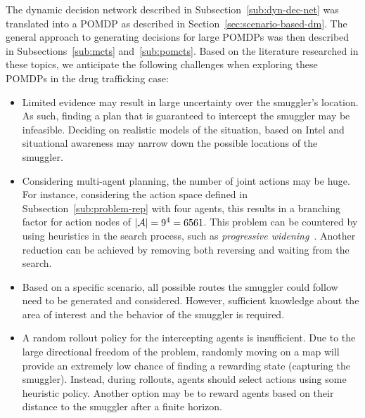 \documentclass[conference]{IEEEtran}
\begin{document}

The dynamic decision network described in Subsection~\ref{sub:dyn-dec-net} was translated into a POMDP as described in Section~\ref{sec:scenario-based-dm}. The general approach to generating decisions for large POMDPs was then described in Subsections~\ref{sub:mcts} and~\ref{sub:pomcts}. Based on the literature researched in these topics, we anticipate the following challenges when exploring these POMDPs in the drug trafficking case:
\begin{itemize}
\item Limited evidence may result in large uncertainty over the smuggler's location. As such, finding a plan that is guaranteed to intercept the smuggler may be infeasible. Deciding on realistic models of the situation, based on Intel and situational awareness may narrow down the possible locations of the smuggler.
\item Considering multi-agent planning, the number of joint actions may be huge. For instance, considering the action space defined in Subsection~\ref{sub:problem-rep} with four agents, this results in a branching factor for action nodes of $\left\vert{\mathcal{A}}\right\vert=9^4=6561$. This problem can be countered by using heuristics in the search process, such as \emph{progressive widening}~\cite{chaslot2008progressive}. Another reduction can be achieved by removing both reversing \cite{realtime2014} and waiting from the search.
\item Based on a specific scenario, all possible routes the smuggler could follow need to be generated and considered. However, sufficient knowledge about the area of interest and the behavior of the smuggler is required.
\item A random rollout policy for the intercepting agents is insufficient. Due to the large directional freedom of the problem, randomly moving on a map will provide an extremely low chance of finding a rewarding state (\ie capturing the smuggler). Instead, during rollouts, agents should select actions using some heuristic policy. Another option may be to reward agents based on their distance to the smuggler after a finite horizon.
\end{itemize}




\end{document}
